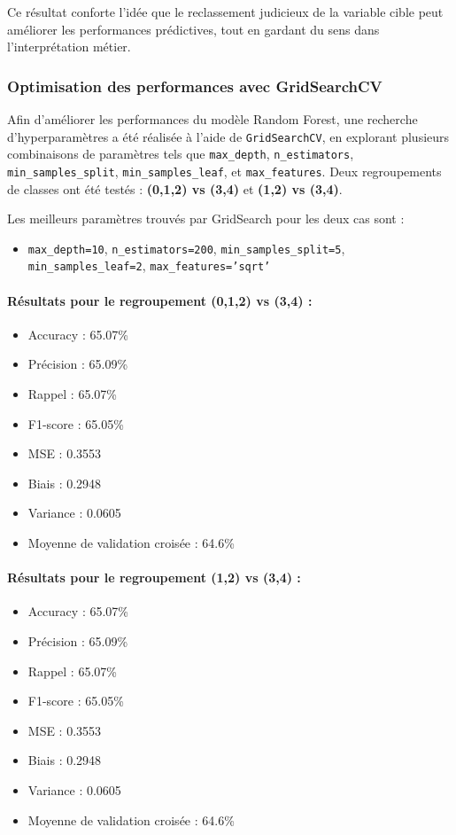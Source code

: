 \documentclass[a4paper,12pt]{article}
\begin{document}
Ce résultat conforte l'idée que le reclassement judicieux de la variable cible peut améliorer les performances prédictives, tout en gardant du sens dans l'interprétation métier.
\subsubsection{Optimisation des performances avec GridSearchCV}

Afin d'améliorer les performances du modèle Random Forest, une recherche d'hyperparamètres a été réalisée à l’aide de \texttt{GridSearchCV}, en explorant plusieurs combinaisons de paramètres tels que \texttt{max\_depth}, \texttt{n\_estimators}, \texttt{min\_samples\_split}, \texttt{min\_samples\_leaf}, et \texttt{max\_features}. Deux regroupements de classes ont été testés : \textbf{(0,1,2) vs (3,4)} et \textbf{(1,2) vs (3,4)}.

Les meilleurs paramètres trouvés par GridSearch pour les deux cas sont :
\begin{itemize}
    \item \texttt{max\_depth=10}, \texttt{n\_estimators=200}, \texttt{min\_samples\_split=5}, \texttt{min\_samples\_leaf=2}, \texttt{max\_features='sqrt'}
\end{itemize}

\paragraph{Résultats pour le regroupement (0,1,2) vs (3,4) :}
\begin{itemize}
    \item Accuracy : 65.07\%
    \item Précision : 65.09\%
    \item Rappel : 65.07\%
    \item F1-score : 65.05\%
    \item MSE : 0.3553
    \item Biais : 0.2948
    \item Variance : 0.0605
    \item Moyenne de validation croisée : 64.6\%
\end{itemize}

\paragraph{Résultats pour le regroupement (1,2) vs (3,4) :}
\begin{itemize}
    \item Accuracy : 65.07\%
    \item Précision : 65.09\%
    \item Rappel : 65.07\%
    \item F1-score : 65.05\%
    \item MSE : 0.3553
    \item Biais : 0.2948
    \item Variance : 0.0605
    \item Moyenne de validation croisée : 64.6\%
\end{itemize}
\end{document}
